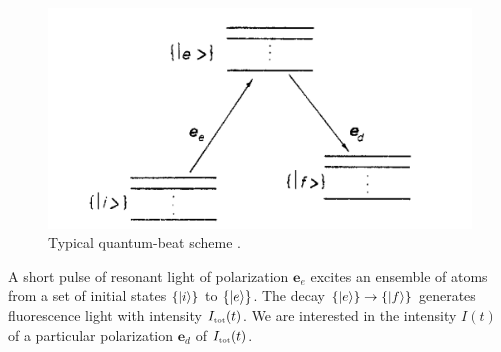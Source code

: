 \documentclass[11pt]{article}
\begin{document}
\begin{figure}[!htb]
	\centering
	\includegraphics[scale=0.7]{energies}
	\caption{Typical quantum-beat scheme \cite{Luypaert_1977}.}
	\label{fig:energies}
\end{figure}


A short pulse of resonant light of polarization $\mathbf{e}_e$ excites an ensemble of atoms from a set of initial states $\{ \ket{i}  \}$ to $\{ \ket{e} \}$. The decay $\{ \ket{e} \} \to\{ \ket{f}  \}$ generates fluorescence light with intensity $I_{\tiny{\mbox{tot}}}(t)$. We are interested in the intensity $I(t)$ of a particular polarization $\mathbf{e}_d$ of $I_{\tiny{\mbox{tot}}}(t)$.  
\end{document}
